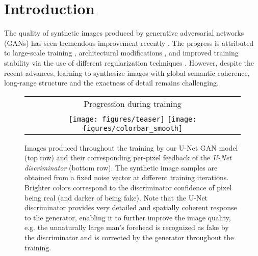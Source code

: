 \documentclass[10pt,twocolumn,letterpaper]{article}
\begin{document}
\vspace{-0.5em}
\section{Introduction}\label{intro} 
\vspace{-0.5em}
The quality of synthetic images produced by generative adversarial networks (GANs) has seen tremendous improvement recently \cite{Brock2019, Karras2018ASG}.
The progress is attributed to large-scale training \cite{Menick2018GeneratingHF,Brock2019}, architectural modifications \cite{Zhang_SAGAN19, karras2018progressive, Karras2018ASG, Lin2019COCOGANGB}, and improved training stability via the use of different regularization techniques \cite{miyato2018spectral, Zhang2019ConsistencyRF}.
However, despite the recent advances, learning to synthesize images with global semantic coherence, long-range structure and the exactness of detail remains challenging. 

\begin{figure}[t]
	\begin{centering}
		\setlength{\tabcolsep}{0.1em}
		\renewcommand{\arraystretch}{0}
		\par\end{centering}
	\begin{centering}
\begin{tabular}{@{\hskip -0.05in}c@{}}
	  \vspace{-0.03in}
	  Progression during training\\
    \texttt{[image: figures/teaser]}
	\texttt{[image: figures/colorbar\_smooth]}  
    	\end{tabular}
	
		\par\end{centering}
	\caption{\label{fig:teaser}Images produced throughout the training by our U-Net GAN model (top row) and their corresponding per-pixel feedback of the \textit{U-Net discriminator} (bottom row). The synthetic image samples are obtained from a fixed noise vector at different training iterations. Brighter colors correspond to the discriminator confidence of pixel being real (and darker of being fake). Note that the U-Net discriminator provides very detailed and spatially coherent response to the generator, enabling it to further improve the image quality, e.g. the unnaturally large man's forehead is recognized as fake by the discriminator and is corrected by the generator throughout the training.}
\end{figure}
\end{document}
